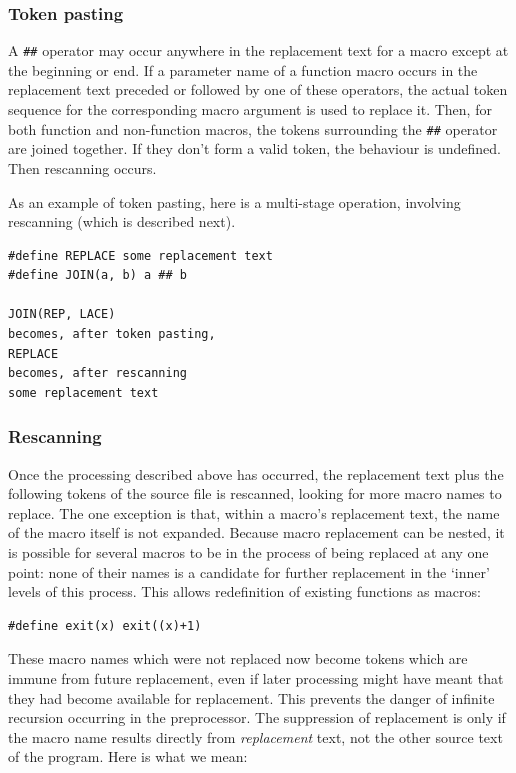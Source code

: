    

   \subsubsection{Token pasting}
    

    A \texttt{\#\#} operator may occur anywhere in the replacement text
     for a macro except at the beginning or end. If a parameter name of
     a function macro occurs in the replacement text preceded or followed by
     one of these operators, the actual token sequence for the corresponding
     macro argument is used to replace it. Then, for both function and
     non-function macros, the tokens surrounding the \texttt{\#\#}
     operator are joined together. If they don't form a valid token, the
     behaviour is undefined. Then rescanning occurs.


    As an example of token pasting, here is a multi-stage operation,
     involving rescanning (which is described next).


    \begin{Verbatim}
#define REPLACE some replacement text
#define JOIN(a, b) a ## b

JOIN(REP, LACE)
becomes, after token pasting,
REPLACE
becomes, after rescanning
some replacement text
\end{Verbatim}

   

   \subsubsection{Rescanning}
    

    Once the processing described above has occurred, the replacement
     text plus the following tokens of the source file is rescanned, looking
     for more macro names to replace. The one exception is that, within
     a macro's replacement text, the name of the macro itself is not
     expanded. Because macro replacement can be nested, it is possible for
     several macros to be in the process of being replaced at any one point:
     none of their names is a candidate for further replacement in the
     `inner' levels of this process. This allows redefinition of
     existing functions as macros:


    \begin{Verbatim}
#define exit(x) exit((x)+1)
\end{Verbatim}

    These macro names which were not replaced now become tokens which are
     immune from future replacement, even if later processing might have
     meant that they had become available for replacement. This prevents the
     danger of infinite recursion occurring in the preprocessor. The
     suppression of replacement is only if the macro name results directly
     from \textit{replacement} text, not the other source text of the
     program. Here is what we mean:


